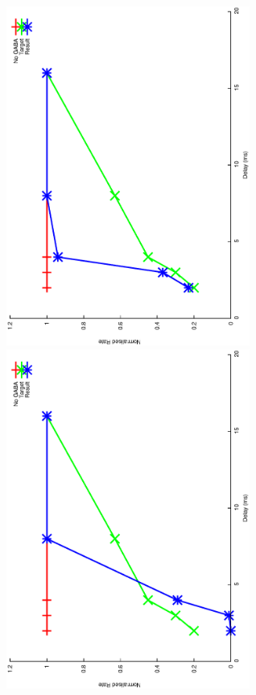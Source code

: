 \documentclass{article}
\begin{document}
\includegraphics[keepaspectratio=true,angle=-90,width=0.6\textwidth]{DS_ClickRecovery_result.18.eps}\clearpage
\includegraphics[keepaspectratio=true,angle=-90,width=0.6\textwidth]{DS_ClickRecovery_result.19.eps}\clearpage
\end{document}
